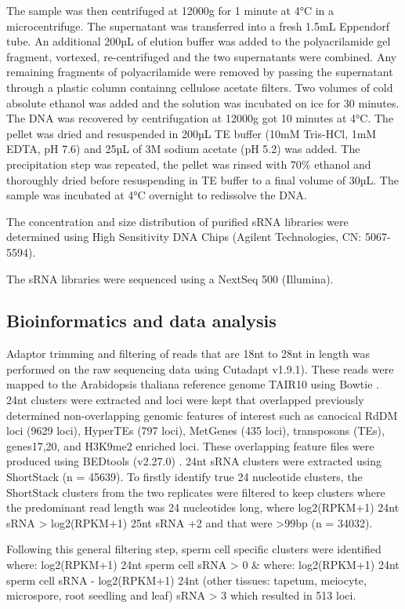 The sample was then centrifuged at 12000g for 1 minute at 4°C in a microcentrifuge. The supernatant was transferred into a fresh 1.5mL Eppendorf tube. An additional 200µL of elution buffer was added to the polyacrilamide gel fragment, vortexed, re-centrifuged and the two supernatants were combined. Any remaining fragments of polyacrilamide were removed  by passing the supernatant through a plastic column containng cellulose acetate filters. Two volumes of cold absolute ethanol was added and the solution was incubated on ice for 30 minutes. The DNA was recovered by centrifugation at 12000g got 10 minutes at 4°C. The pellet was dried and resuspended in 200µL TE buffer (10mM Tris-HCl, 1mM EDTA, pH 7.6) and 25µL of 3M sodium acetate (pH 5.2) was added. The precipitation step was repeated, the pellet was rinsed with 70\% ethanol and thoroughly dried before resuspending in TE buffer to a final volume of 30µL. The sample was incubated at 4°C overnight to redissolve the DNA.

The concentration and size distribution of purified sRNA libraries were determined using  High Sensitivity DNA Chips (Agilent Technologies, CN: 5067-5594).

The sRNA libraries were sequenced using a NextSeq 500 (Illumina).

\subsection{Bioinformatics and data analysis}

Adaptor trimming and filtering of reads that are 18nt to 28nt in length was performed on the raw sequencing data using Cutadapt \cite{RN88} v1.9.1). These reads were mapped to the Arabidopsis thaliana reference genome TAIR10 using Bowtie \cite{RN89}. 24nt clusters were extracted and loci were kept that overlapped previously determined non-overlapping genomic features of interest such as canocical RdDM loci (9629 loci), HyperTEs (797 loci), MetGenes (435 loci), transposons (TEs), genes17,20, and H3K9me2 enriched loci. These overlapping feature files were produced using BEDtools (v2.27.0) \cite{RN90}. 24nt sRNA clusters were extracted using ShortStack \cite{RN142} (n = 45639). To firstly identify true 24 nucleotide clusters, the ShortStack clusters from the two replicates were filtered to keep clusters where the predominant read length was 24 nucleotides long, where log2(RPKM+1) 24nt sRNA > log2(RPKM+1) 25nt sRNA +2 and that were >99bp (n = 34032).

Following this general filtering step, sperm cell specific clusters were identified where:
log2(RPKM+1) 24nt sperm cell sRNA > 0 \& where:
log2(RPKM+1) 24nt sperm cell sRNA - log2(RPKM+1) 24nt (other tissues: tapetum, meiocyte, microspore, root seedling and leaf) sRNA > 3 which resulted in 513 loci.

